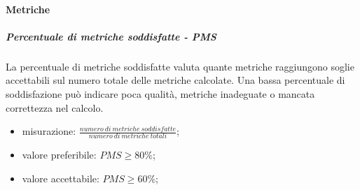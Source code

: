 		\paragraph{Metriche}
			\subparagraph{Percentuale di metriche soddisfatte - PMS}
			La percentuale di metriche soddisfatte valuta quante metriche raggiungono soglie accettabili sul numero totale delle metriche calcolate. Una bassa percentuale di soddisfazione può indicare poca qualità, metriche inadeguate o mancata correttezza nel calcolo.
			\begin{itemize}
				\item misurazione: $\frac{numero\ di\ metriche\ soddisfatte}{numero\ di\ metriche\ totali} $;
				\item valore preferibile: $PMS \geq 80\%$;
				\item valore accettabile: $PMS \geq 60\%$;
			\end{itemize}
	

